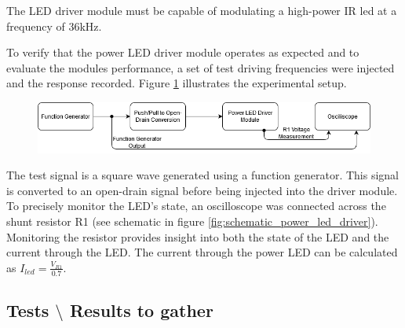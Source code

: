 The LED driver module must be capable of modulating a high-power IR led at a frequency of 36kHz.

To verify that the power LED driver module operates as expected and to evaluate the modules performance, a set of test driving frequencies were injected and the response recorded. Figure \ref{fig:power_led_driver_experiemnt_setup} illustrates the experimental setup.

\begin{figure}[H]
	\centering
	\includegraphics[width=.9\linewidth]{figures/experimentation/power_led_driver_experimental_setup.png}
	\label{fig:power_led_driver_experiemnt_setup}
\end{figure}

The test signal is a square wave generated using a function generator. This signal is converted to an open-drain signal before being injected into the driver module. To precisely monitor the LED's state, an oscilloscope was connected across the shunt resistor R1 (see schematic in figure \ref{fig:schematic_power_led_driver}). Monitoring the resistor provides insight into both the state of the LED and the current through the LED. The current through the power LED can be calculated as \(I_{led} = \frac{V_{R1}}{0.7}\).








\newpage
\subsection{Tests $\setminus$ Results to gather}

